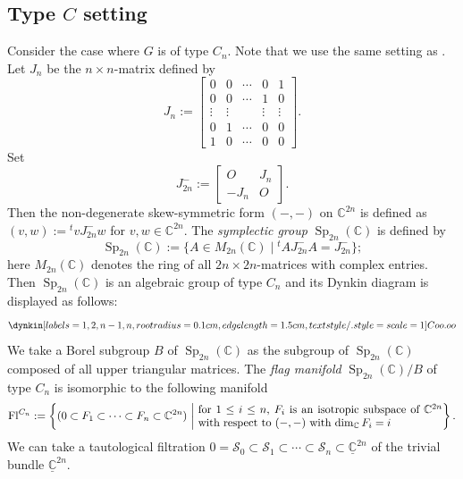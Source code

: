 \documentclass[a4paper, 11pt, reqno]{amsart}
\numberwithin{equation}{section}
\newcommand{\BC}{\mathbb{C}}
\newcommand{\udBC}{\underline{\BC}}
\newcommand{\CS}{\mathcal{S}}
\newcommand{\Sp}[1]{\operatorname{Sp}_{#1}(\BC)}
\newcommand{\FlC}[1]{\operatorname{Fl}^{C_{#1}}}
\theoremstyle{plain}
\theoremstyle{definition}
\theoremstyle{remark}
\begin{document}
\subsection{\texorpdfstring{Type $C$ setting}{Type C setting}}
Consider the case where $G$ is of type $C_{n}$. Note that we use the same setting as \cite[Section~2.4]{Kouno}.
Let $J_{n}$ be the $n \times n$-matrix defined by 
\begin{equation}
J_{n} := \begin{bmatrix}
0 & 0 & \cdots & 0 & 1 \\ 
0 & 0 & \cdots & 1 & 0 \\ 
\vdots & \vdots &  & \vdots & \vdots \\ 
0 & 1 & \cdots & 0 & 0 \\ 
1 & 0 & \cdots & 0 & 0
\end{bmatrix}. 
\end{equation}
Set 
\begin{equation}
J_{2n}^{-} := \begin{bmatrix}
O & J_{n} \\ 
-J_{n} & O 
\end{bmatrix}. 
\end{equation}
Then the non-degenerate skew-symmetric form $(-, -)$ on $\BC^{2n}$ is defined as $(v, w) := {}^{t}v J_{2n}^{-} w$ for $v, w \in \BC^{2n}$. 
The \emph{symplectic group} $\Sp{2n}$ is defined by 
\begin{equation}
\Sp{2n} := \{ A \in M_{2n}(\BC) \mid {}^{t}A J_{2n}^{-} A = J_{2n}^{-} \}; 
\end{equation}
here $M_{2n}(\BC)$ denotes the ring of all $2n \times 2n$-matrices with complex entries. 
Then $\Sp{2n}$ is an algebraic group of type $C_{n}$ and its Dynkin diagram is displayed as follows: 
\begin{equation}
\dynkin[labels={1,2,n-1,n}, root radius=0.1cm, edge length=1.5cm, text style/.style={scale=1}]{C}{oo.oo}
\end{equation}
We take a Borel subgroup $B$ of $\Sp{2n}$ as the subgroup of $\Sp{2n}$ composed of all upper triangular matrices. 
The \emph{flag manifold} $\Sp{2n}/B$ of type $C_{n}$ is isomorphic to the following manifold
\begin{equation}
\FlC{n} := \left\{ (0 \subset F_{1} \subset \cdots \subset F_{n} \subset \BC^{2n}) \ \middle| \ \parbox{22em}{for $1 \le i \le n$, $F_{i}$ is an isotropic subspace of $\BC^{2n}$ with respect to $(-, -)$ with $\dim_{\BC}F_{i} = i$} \right\}. 
\end{equation}
We can take a tautological filtration $0 = \CS_{0} \subset \CS_{1} \subset \cdots \subset \CS_{n} \subset \udBC^{2n}$ of the trivial bundle $\udBC^{2n}$. 
\end{document}
